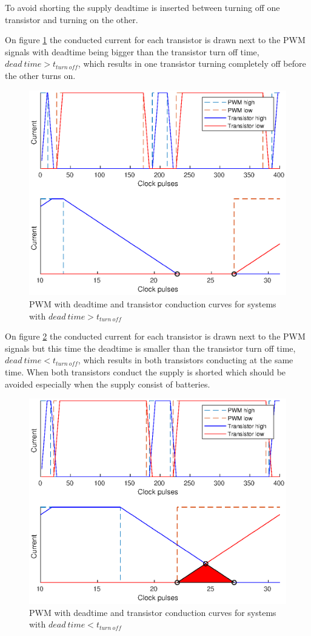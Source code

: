 To avoid shorting the supply deadtime is inserted between turning off one transistor and turning on the other.

On figure \ref{fig:turn_off_time1} the conducted current for each transistor is drawn next to the PWM signals with deadtime being bigger than the transistor turn off time, $dead \ time > t_{turn \ off}$, which results in one transistor turning completely off before the other turns on. 

\begin{figure}[H]
	\centering
	\includegraphics[width=0.8 \textwidth]{pictures/software/turn_off_time1.eps}
	\caption{PWM with deadtime and transistor conduction curves for systems with $dead \ time > t_{turn \ off}$}
	\label{fig:turn_off_time1}
\end{figure}

On figure \ref{fig:turn_off_time2} the conducted current for each transistor is drawn next to the PWM signals but this time the deadtime is smaller than the transistor turn off time, $dead \ time < t_{turn \ off}$, which results in both transistors conducting at the same time.
When both transistors conduct the supply is shorted which should be avoided especially when the supply consist of batteries.

\begin{figure}[H]
	\centering
	\includegraphics[width=0.8 \textwidth]{pictures/software/turn_off_time2.eps}
	\caption{PWM with deadtime and transistor conduction curves for systems with $dead \ time < t_{turn \ off}$}
	\label{fig:turn_off_time2}
\end{figure}

